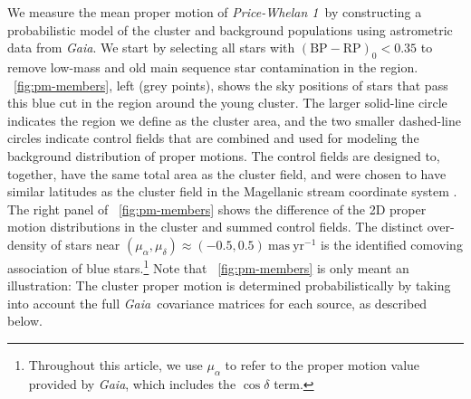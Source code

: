 \documentclass[twocolumn]{aastex62}
\newcommand{\gaia}{\textsl{Gaia}}
\newcommand{\masyr}{\ensuremath{\textrm{mas}~\textrm{yr}^{-1}}}
\newcommand{\clustername}{\textsl{Price-Whelan 1}}
\newcommand{\bprp}{\ensuremath{\textrm{BP} - \textrm{RP}}}
\begin{document}
We measure the mean proper motion of \clustername\ by constructing a probabilistic model of the cluster and background populations using astrometric data from \gaia.
We start by selecting all stars with $(\bprp)_0 < 0.35$ to remove low-mass and old main sequence star contamination in the region.
\figurename~\ref{fig:pm-members}, left (grey points), shows the sky positions of stars that pass this blue cut in the region around the young cluster.
The larger solid-line circle indicates the region we define as the cluster area, and the two smaller dashed-line circles indicate control fields that are combined and used for modeling the background distribution of proper motions.
The control fields are designed to, together, have the same total area as the cluster field, and were chosen to have similar latitudes as the cluster field in the Magellanic stream coordinate system \citep{Nidever:2008}.
The right panel of \figurename~\ref{fig:pm-members} shows the difference of the 2D proper motion distributions in the cluster and summed control fields.
The distinct over-density of stars near $(\mu_\alpha, \mu_\delta) \approx (-0.5, 0.5)~\masyr$ is the identified comoving association of blue stars.\footnote{Throughout this article, we use $\mu_\alpha$ to refer to the proper motion value provided by \gaia, which includes the $\cos\delta$ term.}
Note that \figurename~\ref{fig:pm-members} is only meant an illustration: The cluster proper motion is determined probabilistically by taking into account the full \gaia\ covariance matrices for each source, as described below.
\end{document}
